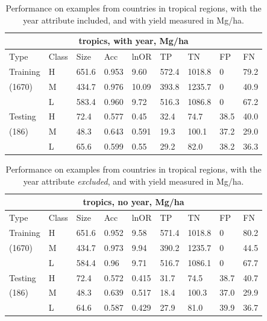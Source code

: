 \documentclass[11pt]{article}
\begin{document}
\begin{table}[h!]
\centering
\begin{tabular}{lllllllll}
\toprule
\multicolumn{9}{c}{\textbf{tropics, with year, Mg/ha}} \\
\midrule
Type & Class & Size & Acc & lnOR & TP & TN & FP & FN\\
\midrule
Training & H & 651.6 & 0.953 & 9.60 & 572.4 & 1018.8 & 0 & 79.2  \\
(1670) & M & 434.7 & 0.976 & 10.09 & 393.8 & 1235.7 & 0 & 40.9  \\
& L & 583.4 & 0.960 & 9.72 & 516.3 & 1086.8 & 0 & 67.2  \\
Testing & H & 72.4 & 0.577 & 0.45 & 32.4 & 74.7 & 38.5 & 40.0  \\
(186) & M & 48.3 & 0.643 & 0.591 & 19.3 & 100.1 & 37.2 & 29.0  \\
& L & 65.6 & 0.599 & 0.55 & 29.2 & 82.0 & 38.2 & 36.3  \\
\bottomrule
\end{tabular}
\caption{Performance on examples from countries in tropical regions, with the year attribute included, and with yield measured in Mg/ha.}
\label{t.wy.trop_results}
\end{table}

\begin{table}[h!]
\centering
\begin{tabular}{lllllllll}
\toprule
\multicolumn{9}{c}{\textbf{tropics, no year, Mg/ha}} \\
\midrule
Type & Class & Size & Acc & lnOR & TP & TN & FP & FN \\
\midrule
Training & H & 651.6 & 0.952 & 9.58 & 571.4 & 1018.8 & 0 & 80.2  \\
(1670) & M & 434.7 & 0.973 & 9.94 & 390.2 & 1235.7 & 0 & 44.5  \\
& L & 584.4 & 0.96 & 9.71 & 516.7 & 1086.1 & 0 & 67.7  \\
Testing & H & 72.4 & 0.572 & 0.415 & 31.7 & 74.5 & 38.7 & 40.7  \\
(186) & M & 48.3 & 0.639 & 0.517 & 18.4 & 100.3 & 37.0 & 29.9  \\
& L & 64.6 & 0.587 & 0.429 & 27.9 & 81.0 & 39.9 & 36.7  \\
\bottomrule
\end{tabular}
\caption{Performance on examples from countries in tropical regions, with the year attribute \emph{excluded}, and with yield measured in Mg/ha.}
\label{t.ny.trop_results}
\end{table}
\end{document}
